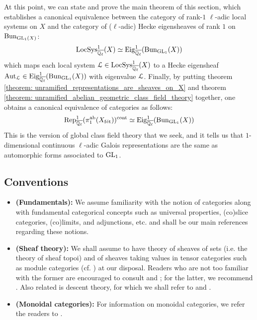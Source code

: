         At this point, we can state and prove the main theorem of this section, which establishes a canonical equivalence between the category of rank-$1$ $\ell$-adic local systems on $X$ and the category of ($\ell$-adic) Hecke eigensheaves of rank $1$ on $\mathrm{Bun}_{\operatorname{GL}_1(X)}$:
            $$\mathrm{LocSys}_{\overline{\mathbb{Q}_{\ell}}}^1(X) \simeq \mathrm{Eig}^1_{\overline{\mathbb{Q}_{\ell}}}(\mathrm{Bun}_{\operatorname{GL}_1}(X))$$
        which maps each local system $\mathcal{L} \in \mathrm{LocSys}_{\overline{\mathbb{Q}_{\ell}}}^1(X)$ to a Hecke eigensheaf $\mathrm{Aut}_{\mathcal{L}} \in \mathrm{Eig}^1_{\overline{\mathbb{Q}_{\ell}}}(\mathrm{Bun}_{\operatorname{GL}_1}(X))$ with eigenvalue $\mathcal{L}$. Finally, by putting theorem \ref{theorem: unramified_representations_are_sheaves_on_X} and theorem \ref{theorem: unramified_abelian_geometric_class_field_theory} together, one obtains a canonical equivalence of categories as follows:
            $$\mathrm{Rep}_{\overline{\mathbb{Q}_{\ell}}}^1(\pi_1^{\mathrm{ab}}(X_{\mathrm{f\acute{e}t}}))^{\mathrm{cont}} \simeq \mathrm{Eig}^1_{\overline{\mathbb{Q}_{\ell}}}(\mathrm{Bun}_{\operatorname{GL}_1}(X))$$
        This is the version of global class field theory that we seek, and it tells us that $1$-dimensional continuous $\ell$-adic Galois representations are the same as automorphic forms associated to $\operatorname{GL}_1$.
        
    \subsection{Conventions}
        \begin{convention} \label{conv: category_theory}
            \noindent
            \begin{itemize}
                \item \textbf{(Fundamentals):} We assume familiarity with the notion of categories along with fundamental categorical concepts such as universal properties, (co)slice categories, (co)limits, and adjunctions, etc. \cite{maclane} and \cite[\href{https://stacks.math.columbia.edu/tag/0011}{Tag 0011}]{stacks} shall be our main references regarding these notions.
                \item \textbf{(Sheaf theory):} We shall assume to have theory of sheaves of sets (i.e. the theory of sheaf topoi) and of sheaves taking values in tensor categories such as module categories (cf. \cite{EGNO}) at our disposal. Readers who are not too familiar with the former are encouraged to consult \cite{sga4} and \cite[\href{https://stacks.math.columbia.edu/tag/00UZ}{Tag 00UZ}]{stacks}; for the latter, we recommend \cite[\href{https://stacks.math.columbia.edu/tag/006A}{Tag 006A}, \href{https://stacks.math.columbia.edu/tag/01AC}{Tag 01AC}, and \href{https://stacks.math.columbia.edu/tag/03A4}{Tag 03A4}]{stacks}. Also related is descent theory, for which we shall refer to \cite{vistoli_descent} and \cite[\href{https://stacks.math.columbia.edu/tag/0266}{Tag 0266} and \href{https://stacks.math.columbia.edu/tag/0238}{Tag 0238}]{stacks}.
                \item \textbf{(Monoidal categories):} For information on monoidal categories, we refer the readers to \cite{EGNO}.
            \end{itemize}
        \end{convention}
        
